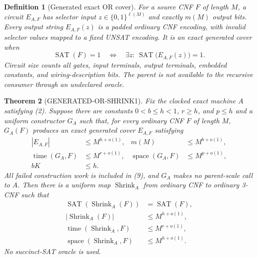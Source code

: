 \documentclass[11pt]{article}
\newcommand{\SAT}{\operatorname{SAT}}
\newtheorem{theorem}{Theorem}
\newtheorem{definition}[theorem]{Definition}
\begin{document}
\begin{definition}[Generated exact OR cover]
For a source CNF $F$ of length $M$, a circuit $E_{A,F}$ has selector input
$z\in\{0,1\}^{\ell(M)}$ and exactly $m(M)$ output bits.  Every output string
$E_{A,F}(z)$ is a padded ordinary CNF encoding, with invalid selector values
mapped to a fixed UNSAT encoding.  It is an exact generated cover when
\begin{equation}
 \SAT(F)=1\quad\Longleftrightarrow\quad
 \exists z:\ \SAT\bigl(E_{A,F}(z)\bigr)=1.              \tag{7}
\end{equation}
Circuit size counts all gates, input terminals, output terminals, embedded
constants, and wiring-description bits.  The parent is not available to the
recursive consumer through an undeclared oracle.
\end{definition}

\begin{theorem}[GENERATED-OR-SHRINK1]
Fix the clocked exact machine $A$ satisfying (2).  Suppose there are constants
$0<b\le h<1$, $r\ge h$, and $p\le h$ and a uniform constructor $G_A$ such
that, for every ordinary CNF $F$ of length $M$, $G_A(F)$ produces an exact
generated cover $E_{A,F}$ satisfying
\begin{align}
 |E_{A,F}|&\le M^{h+o(1)},&
 m(M)&\le M^{b+o(1)},                                   \tag{8}\\
 \operatorname{time}(G_A,F)&\le M^{r+o(1)},&
 \operatorname{space}(G_A,F)&\le M^{p+o(1)},            \tag{9}\\
 bK&\le h.                                               \tag{10}
\end{align}
All failed construction work is included in (9), and $G_A$ makes no
parent-scale call to $A$.  Then there is a uniform map
$\operatorname{Shrink}_A$ from ordinary CNF to ordinary 3-CNF such that
\begin{align}
 \SAT(\operatorname{Shrink}_A(F))&=\SAT(F),              \tag{11}\\
 |\operatorname{Shrink}_A(F)|&\le M^{h+o(1)},            \tag{12}\\
 \operatorname{time}(\operatorname{Shrink}_A,F)&
     \le M^{r+o(1)},                                    \tag{13}\\
 \operatorname{space}(\operatorname{Shrink}_A,F)&
     \le M^{h+o(1)}.                                    \tag{14}
\end{align}
No succinct-SAT oracle is used.
\end{theorem}
\end{document}
